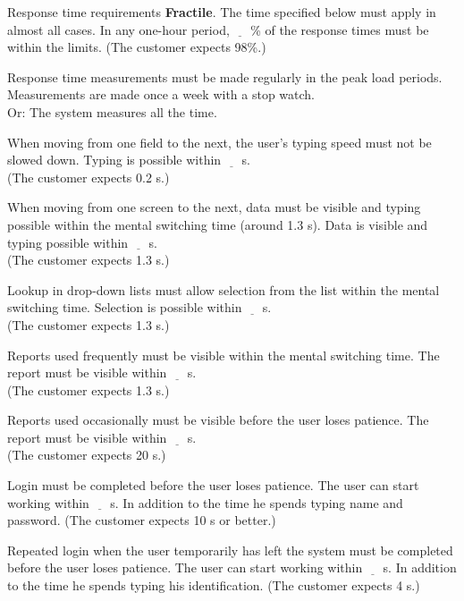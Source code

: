 \documentclass[Main]{subfiles}
\begin{document}
\begin{DynTable}{Response time requirements}
\Doc
{\textbf{Fractile}. The time specified below must apply in almost all cases.}
{In any one-hour period, $\underline{\quad}$ \% of the response times must be within the limits. (The customer expects 98\%.)}
{}

\Doc
{Response time measurements must be made regularly in the peak load periods.}
{Measurements are made once a week with a stop watch.\\
Or: The system measures all the time.}
{}

\Doc
{When moving from one field to the next, the user's typing speed must not be slowed down.}
{Typing is possible within $\underline{\quad}$ s.\\
(The customer expects 0.2 s.)}
{}

\Doc
{When moving from one screen to the next, data must be visible and typing possible within the mental switching time (around 1.3 s).}
{Data is visible and typing possible within $\underline{\quad}$ s.\\
(The customer expects 1.3 s.)}
{}

\Doc
{Lookup in drop-down lists must allow selection from the list within the mental switching time.}
{Selection is possible within $\underline{\quad}$ s.\\
 (The customer expects 1.3 s.)}
{}

\Doc
{Reports used frequently must be visible within the mental switching time.}
{The report must be visible within $\underline{\quad}$ s. \\
(The customer expects 1.3 s.)}
{}

\Doc
{Reports used occasionally must be visible before the user loses patience.}
{The report must be visible within $\underline{\quad}$ s. \\
(The customer expects 20 s.)}
{}

\Doc
{Login must be completed before the user loses patience.}
{The user can start working within $\underline{\quad}$ s. 
In addition to the time he spends typing name and password. (The customer expects 10 s or better.) }
{}

\Doc
{Repeated login when the user temporarily has left the system must be completed before the user loses patience.}
{The user can start working within $\underline{\quad}$ s. In addition to the time he spends typing his identification. (The customer expects 4 s.)}
{}

\end{DynTable}	
\end{document}
